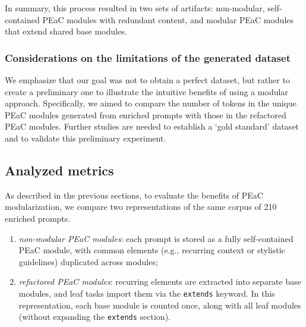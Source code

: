 In summary, this process resulted in two sets of artifacts: non-modular, self-contained PEaC modules with redundant content, and modular PEaC modules that extend shared base modules.

\subsubsection{Considerations on the limitations of the generated dataset}
We emphasize that our goal was not to obtain a perfect dataset, but rather to create a preliminary one to illustrate the intuitive benefits of using a modular approach. Specifically, we aimed to compare the number of tokens in the unique PEaC modules generated from enriched prompts with those in the refactored PEaC modules. Further studies are needed to establish a `gold standard' dataset and to validate this preliminary experiment.



\subsection{Analyzed metrics}
\label{sec:metrics}

As described in the previous sections, to evaluate the benefits of PEaC modularization, we compare two representations of the same corpus of 210 enriched prompts.

\begin{enumerate}
    \item \emph{non-modular PEaC modules}: each prompt is stored as a fully self-contained PEaC module, with common elements (e.g., recurring context or stylistic guidelines) duplicated across modules;
    \item \emph{refactored PEaC modules}: recurring elements are extracted into separate base modules, and leaf tasks import them via the \texttt{extends} keyword. In this representation, each base module is counted once, along with all leaf modules (without expanding the \texttt{extends} section).
\end{enumerate}

